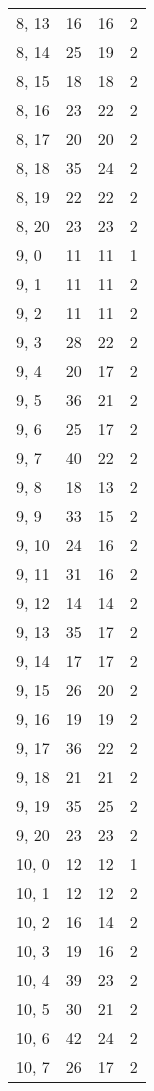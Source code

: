 \begin{table}
\begin{tabular}{llll}
8, 13  &   16 &   16 &     2 \\
8, 14  &   25 &   19 &     2 \\
8, 15  &   18 &   18 &     2 \\
8, 16  &   23 &   22 &     2 \\
8, 17  &   20 &   20 &     2 \\
8, 18  &   35 &   24 &     2 \\
8, 19  &   22 &   22 &     2 \\
8, 20  &   23 &   23 &     2 \\
9, 0   &   11 &   11 &     1 \\
9, 1   &   11 &   11 &     2 \\
9, 2   &   11 &   11 &     2 \\
9, 3   &   28 &   22 &     2 \\
9, 4   &   20 &   17 &     2 \\
9, 5   &   36 &   21 &     2 \\
9, 6   &   25 &   17 &     2 \\
9, 7   &   40 &   22 &     2 \\
9, 8   &   18 &   13 &     2 \\
9, 9   &   33 &   15 &     2 \\
9, 10  &   24 &   16 &     2 \\
9, 11  &   31 &   16 &     2 \\
9, 12  &   14 &   14 &     2 \\
9, 13  &   35 &   17 &     2 \\
9, 14  &   17 &   17 &     2 \\
9, 15  &   26 &   20 &     2 \\
9, 16  &   19 &   19 &     2 \\
9, 17  &   36 &   22 &     2 \\
9, 18  &   21 &   21 &     2 \\
9, 19  &   35 &   25 &     2 \\
9, 20  &   23 &   23 &     2 \\
10, 0  &   12 &   12 &     1 \\
10, 1  &   12 &   12 &     2 \\
10, 2  &   16 &   14 &     2 \\
10, 3  &   19 &   16 &     2 \\
10, 4  &   39 &   23 &     2 \\
10, 5  &   30 &   21 &     2 \\
10, 6  &   42 &   24 &     2 \\
10, 7  &   26 &   17 &     2 \\

\end{tabular}
\end{table}

